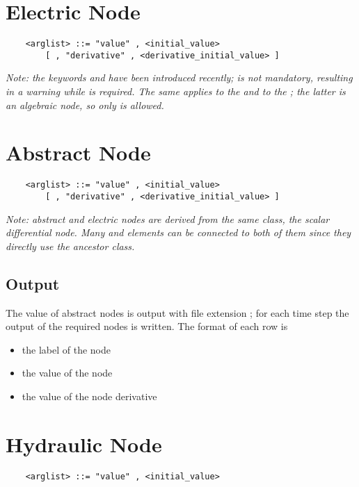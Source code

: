 \section{Electric Node}
\begin{verbatim}
    <arglist> ::= "value" , <initial_value> 
        [ , "derivative" , <derivative_initial_value> ]
\end{verbatim}
\emph{Note: the keywords  and 
have been introduced recently; is not mandatory,
resulting in a warning while  is required.
The same applies to the  
and to the ; the latter is an algebraic
node, so only  is allowed.
}





\section{Abstract Node}
\begin{verbatim}
    <arglist> ::= "value" , <initial_value>
        [ , "derivative" , <derivative_initial_value> ]
\end{verbatim}
{\em
    Note: abstract and electric nodes are derived from the same class, the
    scalar differential node. Many  and  elements 
    can be connected to both of them since they directly use the ancestor
    class. 
}

\subsection{Output}
The value of abstract nodes is output with file extension ; for
each time step the output of the required nodes is written.
The format of each row is
\begin{itemize}
    \item the label of the node
    \item the value of the node
    \item the value of the node derivative
\end{itemize}



\section{Hydraulic Node}
\begin{verbatim}
    <arglist> ::= "value" , <initial_value>
\end{verbatim}



